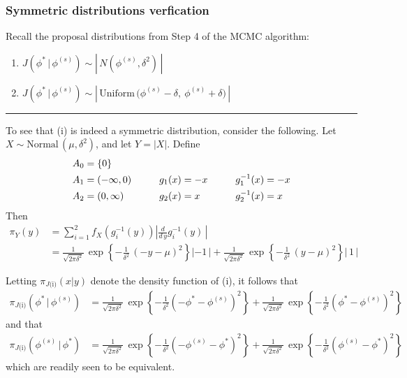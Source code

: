 \documentclass[11pt]{article}
\newcommand{\barS}{\,|\,}
\begin{document}

\subsubsection{Symmetric distributions verfication}

Recall the proposal distributions from Step 4 of the MCMC algorithm:
\begin{enumerate}[label=(\roman*), itemsep=3mm]
\item $ J\left( \phi^* \barS \phi^{(s)} \right) \sim \left|\, N\left( \phi^{(s)}, \delta^2 \right) \,\right| $
\item $ J\left( \phi^* \barS \phi^{(s)} \right) \sim \left|\, \text{Uniform}\, \big( \phi^{(s)} - \delta,~ \phi^{(s)} + \delta \big) \,\right| $
\end{enumerate}

\vspace{0mm} \begin{center} \rule{1.0\textwidth}{0.25mm} \end{center} \vspace{4mm}


\noindent To see that (i) is indeed a symmetric distribution, consider the following.  Let $X \sim \text{Normal}\, (\mu,\delta^2)$, and let $Y = |X|$.  Define
\[ \arraycolsep=5mm \begin{array}{lll}
A_0 = \{0\}       & & \\[1ex]
A_1 = (-\infty,0) & g_1(x) = -x & g_1^{-1}(x) = -x \\[1ex]
A_2 = (0, \infty) &  g_2(x) =x & g_2^{-1}(x) = x
\end{array} \]
Then
\begin{align*}
\pi_Y(y) &= \sum_{i=1}^2 f_X\left( g_i^{-1}(y) \right) \left| \frac{ d }{ d\,y } g_i^{-1}(y) \,\right| \\[1ex]
&= \frac{ 1 }{ \sqrt{ 2\pi\delta^2 } }\, \exp\left\{ - \frac{ 1 }{ \delta^2 }\, (-y - \mu)^2 \right\} | -1 \,| + \frac{ 1 }{ \sqrt{ 2\pi\delta^2 } }\, \exp\left\{ - \frac{ 1 }{ \delta^2 }\, (y - \mu)^2 \right\} |\, 1 \,|
\end{align*} \vspace{4mm}

\noindent Letting $\pi_{J\text{(i)}} \left( x | y \right)$ denote the density function of (i), it follows that 
\begin{align*}
\pi_{J\text{(i)}} \left( \phi^* \barS \phi^{(s)} \right) &= \frac{ 1 }{ \sqrt{ 2\pi\delta^2 } }\, \exp\left\{ - \frac{ 1 }{ \delta^2 } \left(-\phi^* - \phi^{(s)}\right)^2 \right\} + \frac{ 1 }{ \sqrt{ 2\pi\delta^2 } }\, \exp\left\{ - \frac{ 1 }{ \delta^2 } \left(\phi^* - \phi^{(s)}\right)^2 \right\}
\end{align*}
and that
\begin{align*}
\pi_{J\text{(i)}} \left( \phi^{(s)} \barS \phi^* \right) &= \frac{ 1 }{ \sqrt{ 2\pi\delta^2 } }\, \exp\left\{ - \frac{ 1 }{ \delta^2 } \left(-\phi^{(s)} - \phi^*\right)^2 \right\} + \frac{ 1 }{ \sqrt{ 2\pi\delta^2 } }\, \exp\left\{ - \frac{ 1 }{ \delta^2 } \left(\phi^{(s)} - \phi^*\right)^2 \right\}
\end{align*}
which are readily seen to be equivalent.
\end{document}

